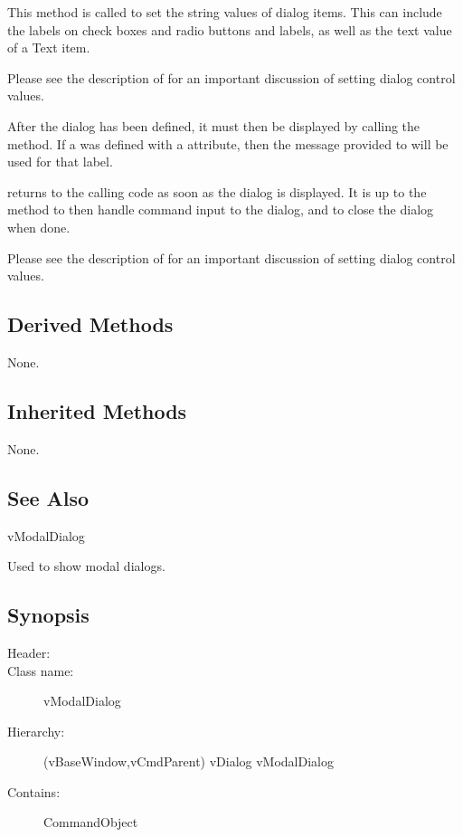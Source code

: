 This method is called to set the string values of dialog items. This
can include the labels on check boxes and radio buttons and
labels, as well as the text value of a Text item.

Please see the description of 
for an important discussion of setting dialog control values.



After the dialog has been defined, it must then be displayed by
calling the  method. If a   was
defined with a  attribute, then the message
provided to  will be used for that label.

 returns to the calling code as soon as the
dialog is displayed. It is up to the  method
to then handle command input to the dialog, and to close the
dialog when done.

Please see the description of 
for an important discussion of setting dialog control values.

\subsection* {Derived Methods}

None.

\subsection* {Inherited Methods}

None.

\subsection* {See Also}

vModalDialog



Used to show modal dialogs.

\subsection* {Synopsis}
\begin{description}
	\item [Header:] 
	\item [Class name:] vModalDialog
 	\item [Hierarchy:] (vBaseWindow,vCmdParent) \rta vDialog \rta vModalDialog
	\item [Contains:] CommandObject
\end{description}

